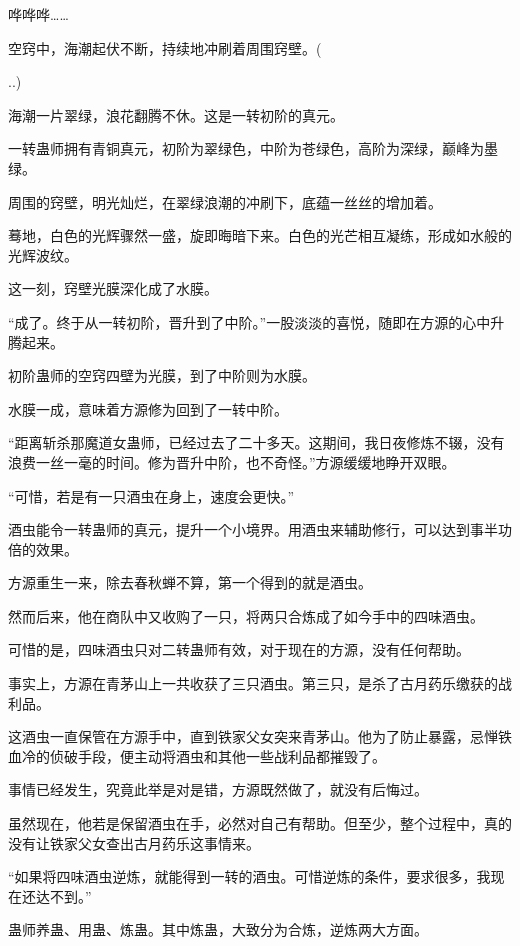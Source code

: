 
\begin{this_body}

哗哗哗……

空窍中，海潮起伏不断，持续地冲刷着周围窍壁。(

..)

海潮一片翠绿，浪花翻腾不休。这是一转初阶的真元。

一转蛊师拥有青铜真元，初阶为翠绿色，中阶为苍绿色，高阶为深绿，巅峰为墨绿。

周围的窍壁，明光灿烂，在翠绿浪潮的冲刷下，底蕴一丝丝的增加着。

蓦地，白色的光辉骤然一盛，旋即晦暗下来。白色的光芒相互凝练，形成如水般的光辉波纹。

这一刻，窍壁光膜深化成了水膜。

“成了。终于从一转初阶，晋升到了中阶。”一股淡淡的喜悦，随即在方源的心中升腾起来。

初阶蛊师的空窍四壁为光膜，到了中阶则为水膜。

水膜一成，意味着方源修为回到了一转中阶。

“距离斩杀那魔道女蛊师，已经过去了二十多天。这期间，我日夜修炼不辍，没有浪费一丝一毫的时间。修为晋升中阶，也不奇怪。”方源缓缓地睁开双眼。

“可惜，若是有一只酒虫在身上，速度会更快。”

酒虫能令一转蛊师的真元，提升一个小境界。用酒虫来辅助修行，可以达到事半功倍的效果。

方源重生一来，除去春秋蝉不算，第一个得到的就是酒虫。

然而后来，他在商队中又收购了一只，将两只合炼成了如今手中的四味酒虫。

可惜的是，四味酒虫只对二转蛊师有效，对于现在的方源，没有任何帮助。

事实上，方源在青茅山上一共收获了三只酒虫。第三只，是杀了古月药乐缴获的战利品。

这酒虫一直保管在方源手中，直到铁家父女突来青茅山。他为了防止暴露，忌惮铁血冷的侦破手段，便主动将酒虫和其他一些战利品都摧毁了。

事情已经发生，究竟此举是对是错，方源既然做了，就没有后悔过。

虽然现在，他若是保留酒虫在手，必然对自己有帮助。但至少，整个过程中，真的没有让铁家父女查出古月药乐这事情来。

“如果将四味酒虫逆炼，就能得到一转的酒虫。可惜逆炼的条件，要求很多，我现在还达不到。”

蛊师养蛊、用蛊、炼蛊。其中炼蛊，大致分为合炼，逆炼两大方面。


\end{this_body}
